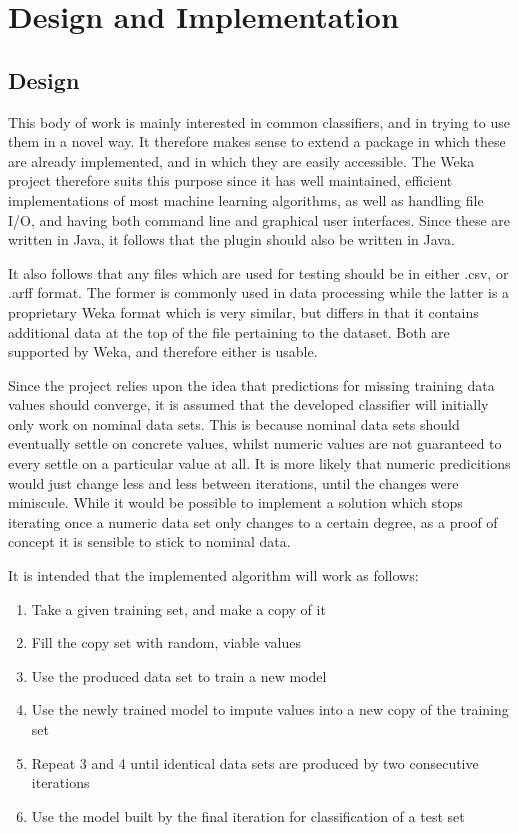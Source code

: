 \newpage
\chapter{Design and Implementation} 
\section{Design}
This body of work is mainly interested in common classifiers, and in trying to use them in a novel way. It therefore makes sense to extend a package in which these are already implemented, and in which they are easily accessible. The Weka project therefore suits this purpose since it has well maintained, efficient implementations of most machine learning algorithms, as well as handling file I/O, and having both command line and graphical user interfaces. Since these are written in Java, it follows that the plugin should also be written in Java.

It also follows that any files which are used for testing should be in either .csv, or .arff format. The former is commonly used in data processing while the latter is a proprietary Weka format which is very similar, but differs in that it contains additional data at the top of the file pertaining to the dataset. Both are supported by Weka, and therefore either is usable.

Since the project relies upon the idea that predictions for missing training data values should converge, it is assumed that the developed classifier will initially only work on nominal data sets. This is because nominal data sets should eventually settle on concrete values, whilst numeric values are not guaranteed to every settle on a particular value at all. It is more likely that numeric predicitions would just change less and less between iterations, until the changes were miniscule. While it would be possible to implement a solution which stops iterating once a numeric data set only changes to a certain degree, as a proof of concept it is sensible to stick to nominal data.

It is intended that the implemented algorithm will work as follows:
\begin{enumerate}
\item Take a given training set, and make a copy of it
\item Fill the copy set with random, viable values
\item Use the produced data set to train a new model
\item Use the newly trained model to impute values into a new copy of the training set
\item Repeat 3 and 4 until identical data sets are produced by two consecutive iterations
\item Use the model built by the final iteration for classification of a test set
\end{enumerate}


